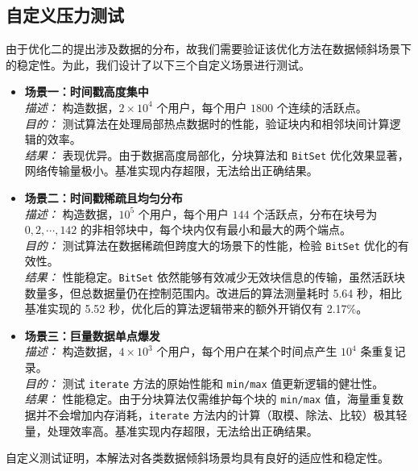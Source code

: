 \documentclass[UTF8]{ctexart}
\begin{document}
\subsection{自定义压力测试}
由于优化二的提出涉及数据的分布，故我们需要验证该优化方法在数据倾斜场景下的稳定性。为此，我们设计了以下三个自定义场景进行测试。
\begin{itemize}
    \item \textbf{场景一：时间戳高度集中} \\
    \textit{描述：} 构造数据，$2\times 10^4$ 个用户，每个用户 $1800$ 个连续的活跃点。\\
    \textit{目的：} 测试算法在处理局部热点数据时的性能，验证块内和相邻块间计算逻辑的效率。\\
    \textit{结果：} 表现优异。由于数据高度局部化，分块算法和 \texttt{BitSet} 优化效果显著，网络传输量极小。基准实现内存超限，无法给出正确结果。

    \item \textbf{场景二：时间戳稀疏且均匀分布} \\
    \textit{描述：} 构造数据，$10^5$ 个用户，每个用户 $144$ 个活跃点，分布在块号为 $0, 2,\cdots, 142$ 的非相邻块中，每个块内仅有最小和最大的两个端点。\\
    \textit{目的：} 测试算法在数据稀疏但跨度大的场景下的性能，检验 \texttt{BitSet} 优化的有效性。\\
    \textit{结果：} 性能稳定。\texttt{BitSet} 依然能够有效减少无效块信息的传输，虽然活跃块数量多，但总数据量仍在控制范围内。改进后的算法测量耗时 5.64 秒，相比基准实现的 5.52 秒，优化后的算法逻辑带来的额外开销仅有 2.17\%。

    \item \textbf{场景三：巨量数据单点爆发} \\
    \textit{描述：} 构造数据，$4\times 10^3$ 个用户，每个用户在某个时间点产生 $10^4$ 条重复记录。\\
    \textit{目的：} 测试 \texttt{iterate} 方法的原始性能和 \texttt{min/max} 值更新逻辑的健壮性。\\
    \textit{结果：} 性能稳定。由于分块算法仅需维护每个块的 \texttt{min/max} 值，海量重复数据并不会增加内存消耗，\texttt{iterate} 方法内的计算（取模、除法、比较）极其轻量，处理效率高。基准实现内存超限，无法给出正确结果。
\end{itemize}
自定义测试证明，本解法对各类数据倾斜场景均具有良好的适应性和稳定性。
\end{document}
